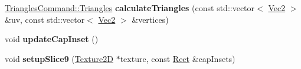 \begin{DoxyCompactItemize}
\item 
\mbox{\label{classui_1_1Scale9Sprite_a41f33114f6a99ee6ada71653ee1b73cf}} 
\hyperlink{structTrianglesCommand_1_1Triangles}{Triangles\+Command\+::\+Triangles} {\bfseries calculate\+Triangles} (const std\+::vector$<$ \hyperlink{classVec2}{Vec2} $>$ \&uv, const std\+::vector$<$ \hyperlink{classVec2}{Vec2} $>$ \&vertices)
\item 
\mbox{\label{classui_1_1Scale9Sprite_adbb847db5b86d84678a0ef7cfa094b15}} 
void {\bfseries update\+Cap\+Inset} ()
\item 
\mbox{\label{classui_1_1Scale9Sprite_a574350fb8b30bd2bc46515295dc40fdf}} 
void {\bfseries setup\+Slice9} (\hyperlink{classTexture2D}{Texture2D} $\ast$texture, const \hyperlink{classRect}{Rect} \&cap\+Insets)
\end{DoxyCompactItemize}
